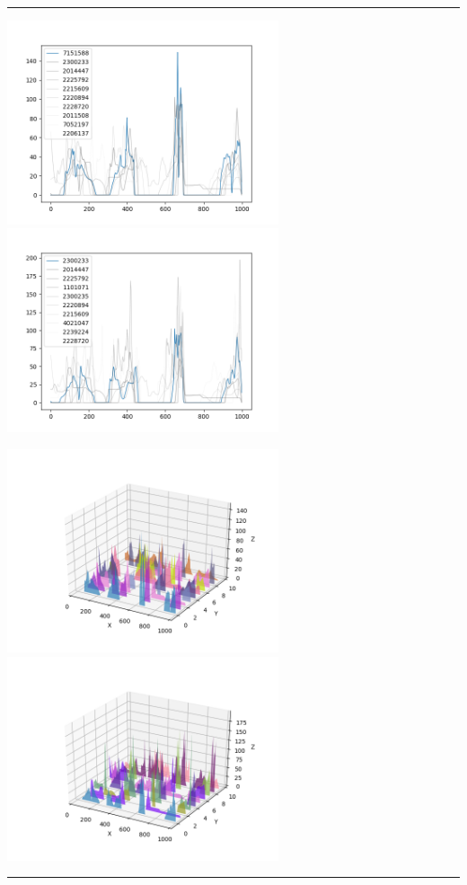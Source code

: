 \documentclass{article}
\begin{document}
\begin{center}
\noindent\rule{\textwidth}{1pt}

\includegraphics[height=6cm, width=8cm]{5.png}\includegraphics[height=6cm, width=8cm]{5_cos.png}

\includegraphics[height=6cm, width=8cm]{5_3d.png} \includegraphics[height=6cm, width=8cm]{5_cos_3d.png}

\noindent\rule{\textwidth}{1pt}

\end{center}
\end{document}
